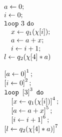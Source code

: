 %
{\small
\begin{figure}
\centering
\begin{subfigure}{.2\textwidth}
\begin{centering}
$
\begin{array}{l}
   a \leftarrow 0; \\
   i \leftarrow 0 ; \\
    \mathtt{loop} ~ 3 ~ \mathtt{do} ~ \\
    \quad
     x \leftarrow q_1(\chi[i])   ; \\
    \quad a \leftarrow a+x; \\
        \quad i \leftarrow i+1; \\
    l \leftarrow q_2(\chi[4]*a)\\
\end{array}
$
\caption{}
\end{centering}
\end{subfigure}
\quad
\begin{subfigure}{.2\textwidth}
\begin{centering}
$
\begin{array}{l}
   \left[  a \leftarrow 0 \right]^{1}; \\
   \left[  i \leftarrow 0 \right]^{2} ; \\
    \mathtt{loop} ~ \left[ 3 \right]^{3} ~ \mathtt{do} ~ \\
    \quad
    \left[  x \leftarrow q_1(\chi[i]) \right]^{4}   ; \\
    \quad \left[ a \leftarrow a+x \right]^{5}; \\
        \quad \left[ i \leftarrow i+1 \right]^{6}; \\
    \left[ l \leftarrow q_2(\chi[4]*a) \right]^{7}\\
\end{array}
$
\caption{}
\end{centering}
\end{subfigure}
\begin{subfigure}{.55\textwidth}
\qquad
{}
\end{subfigure}
\end{figure}}

